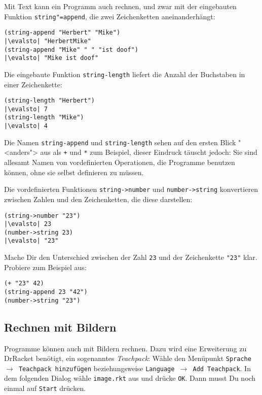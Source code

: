 Mit Text kann ein Programm auch rechnen, und zwar mit der eingebauten
Funktion
\texttt{string"=append},
die zwei Zeichenketten aneinanderhängt:
%
\begin{lstlisting}
(string-append "Herbert" "Mike")
|\evalsto| "HerbertMike"
(string-append "Mike" " " "ist doof")
|\evalsto| "Mike ist doof"
\end{lstlisting}
%
Die eingebaute Funktion
\lstinline{string-length}
liefert die Anzahl der Buchstaben in einer Zeichenkette:
%
\begin{lstlisting}
(string-length "Herbert")
|\evalsto| 7
(string-length "Mike")
|\evalsto| 4
\end{lstlisting}
%
Die Namen \lstinline{string-append} und \lstinline{string-length} sehen auf
den ersten Blick "<anders"> aus als \lstinline{+} und \lstinline{*} zum
Beispiel, dieser Eindruck täuscht jedoch: Sie sind allesamt Namen von
vordefinierten Operationen, die Programme benutzen können, ohne sie
selbst definieren zu müssen.

Die vordefinierten Funktionen
\lstinline{string->number}
und \lstinline{number->string} konvertieren zwischen Zahlen und den
Zeichenketten, die diese darstellen:
%
\begin{lstlisting}
(string->number "23")
|\evalsto| 23
(number->string 23)
|\evalsto| "23"
\end{lstlisting}
%
\begin{aufgabeinline}
  Mache Dir den Unterschied zwischen der Zahl \lstinline{23} und der
  Zeichenkette \lstinline{"23"} klar.  Probiere zum Beispiel aus:
\begin{lstlisting}
(+ "23" 42)
(string-append 23 "42")
(number->string "23")
\end{lstlisting}
\end{aufgabeinline}

\subsection{Rechnen mit Bildern}
\label{sec:rechnen-mit-bildern}

Programme können auch mit Bildern rechnen.  Dazu wird eine Erweiterung
zu DrRacket benötigt, ein sogenanntes
\textit{Teachpack}: Wähle den Menüpunkt
\texttt{Sprache $\rightarrow$ Teachpack hinzufügen} beziehungsweise
\texttt{Language $\rightarrow$ Add Teachpack}.  In dem folgenden Dialog
wähle \texttt{image.rkt} aus und drücke 
\texttt{OK}.  Dann musst Du noch einmal auf \texttt{Start} drücken.

